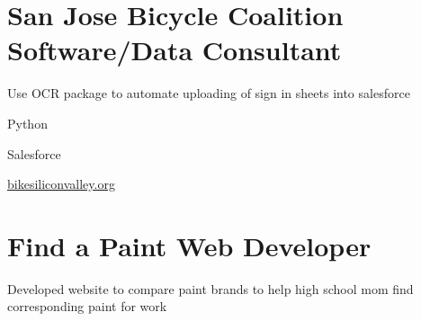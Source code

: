 
\section{
    \textbf{San Jose Bicycle Coalition} \newline
    Software/Data Consultant
}{}

\vspace{-2.0ex}

\begin{detail}
    \BulletItem
    Use OCR package to automate uploading of sign in sheets into salesforce
\end{detail}

\begin{subtitle}
    \vspace{-5ex}
    {{}} 
\end{subtitle}

\vspace{-1.5ex}
{
    \vspace{-0.8ex}
    \color{cyan}\small
    {Python}
}

{
    \vspace{-2.5ex}\hspace{1.5in}
    \color{cyan}\small
    {Salesforce}
}

{
    \vspace{-2.5ex}\hspace{3in}
    \color{blue}\small
    {\href{https://bikesiliconvalley.org/}{bikesiliconvalley.org}{}}
}

\vspace{2.5ex}


\section{
    \textbf{Find a Paint} \newline
    Web Developer
}{}

\vspace{-2.5ex}

\begin{detail}
    \BulletItem
    Developed website to compare paint brands to help high school mom find corresponding paint for work
\end{detail}

